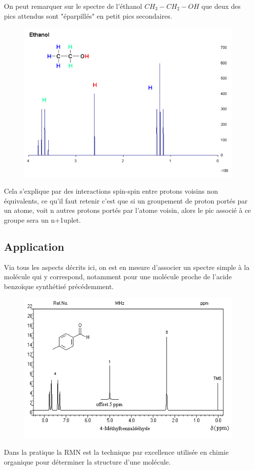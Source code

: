 \documentclass[12pt,prb,aps,epsf]{report}
\begin{document}
On peut remarquer sur le spectre de l'éthanol $CH_3-CH_2-OH$ que deux des pics attendus sont "éparpillés" en petit pics secondaires.
\begin{figure}[h]
	\centerline{\includegraphics[width=13cm]{RMN2_0}}
\end{figure}
Cela s'explique par des interactions spin-spin entre protons voisins non équivalents, ce qu'il faut retenir c'est que si un groupement de proton portés par un atome, voit n autres protons portés par l'atome voisin, alors le pic associé à ce groupe sera un n+1uplet.

\subsection{Application}
Via tous les aspects décrits ici, on est en mesure d'associer un spectre simple à la molécule qui y correspond, notamment pour une molécule proche de l'acide benzoïque synthétisé précédemment.
\begin{figure}
	\centerline{\includegraphics[width=14cm]{RMN3}}
\end{figure}
 Dans la pratique la RMN est la technique par excellence utilisée en chimie organique pour déterminer la structure d'une molécule.
\end{document}
